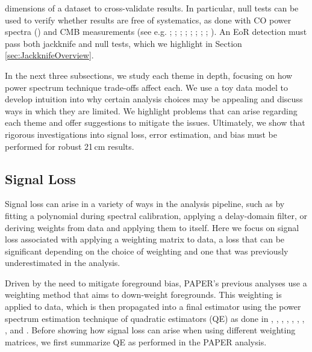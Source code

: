 \documentclass[preprint2,numberedappendix,tighten]{aastex6}
\begin{document}
\begin{itemize}
dimensions of a dataset to cross-validate results. In particular, null tests can be used to verify whether results are free of 
systematics, as done with CO power spectra (\citealt{keating_et_al2016}) and CMB measurements (see e.g. \citealt{ade_et_al2008}; \citealt{chiang_et_al2010}; \citealt{bischoff_et_al2011}; \citealt{das_et_al2011b}; \citealt{araujo_et_al2012}; \citealt{crites_et_al2015}; \citealt{ade_et_al2016}; \citealt{ade_et_al2017}; \citealt{sherwin_et_al2017}). An EoR detection must pass both jackknife and null tests, which we highlight in Section \ref{sec:JackknifeOverview}.
\end{itemize}

In the next three subsections, we study each theme in depth, focusing on how power spectrum technique trade-offs affect each. 
We use a toy data model to develop intuition into why certain analysis choices may be appealing and discuss ways in which 
they are limited. We highlight problems that can arise regarding each theme and offer suggestions to mitigate the issues. 
Ultimately, we show that rigorous investigations into signal loss, error estimation, and bias must be performed for robust 21\,cm results.


\subsection{Signal Loss}
\label{sec:SiglossOverview}

Signal loss can arise in a variety of ways in the analysis pipeline, such as by fitting a polynomial during 
spectral calibration, applying a delay-domain filter, or deriving weights from data and applying them to itself. Here we focus on signal loss associated with 
applying a weighting matrix to data, a loss that can be significant depending on the choice of weighting and one that was 
previously underestimated in the  analysis.

Driven by the need to mitigate foreground bias, PAPER's previous analyses use a weighting method that aims to down-weight 
foregrounds. This weighting is applied to data, which is then propagated into a final estimator using the power spectrum 
estimation technique of quadratic estimators (QE) as done in \citet{liu_tegmark2011}, \citet{dillon_et_al2013a}, \citet{liu_et_al2014a}, \citet{liu_et_al2014b}, \citet{trott_et_al2012}, \citet{dillon_et_al2014}, \citet{dillon_et_al2015}, \citet{switzer_et_al2015}, and \citet{trott_et_al2016}. Before showing 
how signal loss can arise when using different weighting matrices, we first summarize QE as performed in the PAPER 
analysis.
\end{document}
